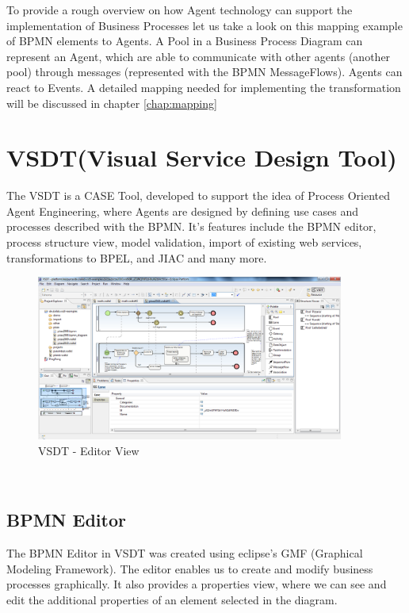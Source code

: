 To provide a rough overview on how Agent technology can support the implementation of Business Processes let us take a look on this mapping example of BPMN elements to Agents. A Pool in a Business Process Diagram can represent an Agent, which are able to communicate with other agents (another pool) through messages (represented with the BPMN MessageFlows). Agents can react to Events. A detailed mapping needed for implementing the transformation will be discussed in chapter \ref{chap:mapping}

\newpage
\section{VSDT(Visual Service Design Tool)}
\label{sec:vsdt}
The VSDT is a CASE Tool, developed to support the idea of Process Oriented Agent Engineering, where Agents are designed by defining use cases and processes described with the BPMN. It's features include the BPMN editor, process structure view, model validation, import of existing web services, transformations to BPEL, and JIAC and many more. 
\begin{figure}[h]
	\centering
		\includegraphics[width=0.90\textwidth]{images/vsdt_snapshot.png}
	\caption{VSDT - Editor View}
	\label{fig:VSDT}
\end{figure}\\

\subsection{BPMN Editor}
The BPMN Editor in VSDT was created using eclipse's GMF (Graphical Modeling Framework). The editor enables us to create and modify business processes graphically. It also provides a properties view, where we can see and edit the additional properties of an element selected in the diagram. 


